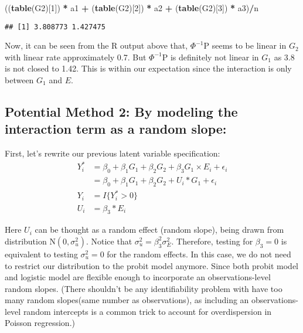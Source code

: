 \documentclass[]{article}
\newenvironment{Shaded}{\begin{snugshade}}{\end{snugshade}}
\newcommand{\DecValTok}[1]{\textcolor[rgb]{0.00,0.00,0.81}{#1}}
\newcommand{\KeywordTok}[1]{\textcolor[rgb]{0.13,0.29,0.53}{\textbf{#1}}}
\newcommand{\NormalTok}[1]{#1}
\newcommand{\OperatorTok}[1]{\textcolor[rgb]{0.81,0.36,0.00}{\textbf{#1}}}
\newcommand{\StringTok}[1]{\textcolor[rgb]{0.31,0.60,0.02}{#1}}
\begin{document}
\begin{Shaded}
\begin{Highlighting}[]
\NormalTok{((}\KeywordTok{table}\NormalTok{(G2)[}\DecValTok{1}\NormalTok{]) }\OperatorTok{*}\StringTok{ }\NormalTok{a1 }\OperatorTok{+}\StringTok{ }\NormalTok{(}\KeywordTok{table}\NormalTok{(G2)[}\DecValTok{2}\NormalTok{]) }\OperatorTok{*}\StringTok{ }\NormalTok{a2 }\OperatorTok{+}\StringTok{ }\NormalTok{(}\KeywordTok{table}\NormalTok{(G2)[}\DecValTok{3}\NormalTok{]) }\OperatorTok{*}\StringTok{ }\NormalTok{a3)}\OperatorTok{/}\NormalTok{n}
\end{Highlighting}
\end{Shaded}

\begin{verbatim}
## [1] 3.808773 1.427475
\end{verbatim}

Now, it can be seen from the R output above that, \(\Phi^{-1}\text{P}\)
seems to be linear in \(G_2\) with linear rate approximately 0.7. But
\(\Phi^{-1}\text{P}\) is definitely not linear in \(G_1\) as 3.8 is not
closed to 1.42. This is within our expectation since the interaction is
only between \(G_1\) and \(E\).

\hypertarget{potential-method-2-by-modeling-the-interaction-term-as-a-random-slope}{%
\subsection{Potential Method 2: By modeling the interaction term as a
random
slope:}\label{potential-method-2-by-modeling-the-interaction-term-as-a-random-slope}}

First, let's rewrite our previous latent variable specification:
\begin{equation}\label{eqn:latentformulationRandomSlope}
\begin{aligned}
Y_i^* &= \beta_0 + \beta_1 G_1 + \beta_2 G_2 + \beta_3 G_1 \times E_i + \epsilon_i \\
      &= \beta_0 + \beta_1 G_1 + \beta_2 G_2 + U_i * G_1 + \epsilon_i \\
Y_i &= I\{Y_i^*>0\} \\
U_i &= \beta_3 * E_i
\end{aligned}
\end{equation}

Here \(U_i\) can be thought as a random effect (random slope), being
drawn from distribution \(\text{N}(0,\sigma_u^2)\). Notice that
\(\sigma_u^2 = \beta_3^2\sigma_E^2\). Therefore, testing for
\(\beta_3 =0\) is equivalent to testing \(\sigma_u^2 = 0\) for the
random effects. In this case, we do not need to restrict our
distribution to the probit model anymore. Since both probit model and
logistic model are flexible enough to incorporate an observations-level
random slopes. (There shouldn't be any identifiability problem with have
too many random slopes(same number as observations), as including an
observations-level random intercepts is a common trick to account for
overdispersion in Poisson regression.)
\end{document}
